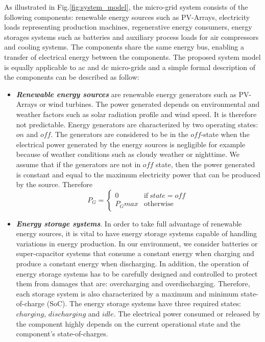 As illustrated in Fig.\ref{fig:system_model}, the micro-grid system consists of the following components: renewable energy sources such as PV-Arrays, electricity loads representing production machines, regenerative energy consumers, energy storages systems such as batteries and auxiliary process loads for air compressors and cooling systems. The components share the same energy bus, enabling a transfer of electrical energy between the components. The proposed system model is equally applicable to ac and dc micro-grids and a simple formal description of the components can be described as follow:
\begin{itemize}
\item{\textit{\textbf{ Renewable energy sources}} are renewable energy generators such as PV-Arrays or wind turbines. The power generated depends on environmental and weather factors such as solar radiation profile and wind speed. It is therefore not predictable. Energy generators are characterized by two operating states: $on$ and $off$. The generators are considered to be in the $off$-state when the electrical power generated by the energy sources is negligible for example because of weather conditions such as cloudy weather or nighttime. We assume that if the generators are not in $off$ state, then the power generated is constant and equal to the maximum electricity power that can be produced by the source. Therefore
%
\begin{equation}
 P_G = 
 \begin{cases}
      0 & \text{if}\ state=off \\
      P_Gmax & \text{otherwise}
    \end{cases} \;
\end{equation}
%
 } 
\item{\textit{\textbf{Energy storage systems}}. In order to take full advantage of renewable energy sources, it is vital to have energy storage systems capable of handling variations in energy production. In our environment, we consider batteries or super-capacitor systems that consume a constant energy when charging and produce a constant energy when discharging. In addition, the operation of energy storage systems has to be carefully designed and controlled to protect them from damages that are: overcharging and overdischarging. Therefore, each storage system is also characterized by a maximum and minimum state-of-charge (SoC). The energy storage systems have three required states: $charging$, $discharging$ and $idle$. The electrical power consumed or released by the component highly depends on the current operational state and the component\rq{s} state-of-charges.}
 

\end{itemize}
